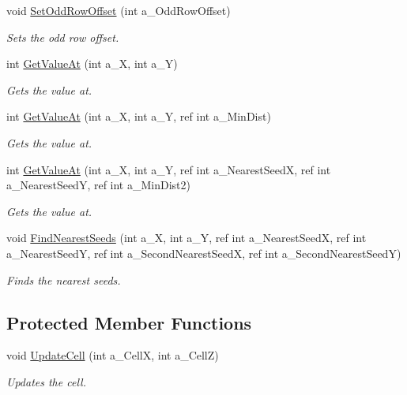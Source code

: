 \begin{DoxyCompactItemize}
void \hyperlink{classc_voronoi_map_a7c2196f0a071bb4f1ed9dbc82f42faed}{Set\+Odd\+Row\+Offset} (int a\+\_\+\+Odd\+Row\+Offset)
\begin{DoxyCompactList}\small\item\em Sets the odd row offset. \end{DoxyCompactList}\item 
int \hyperlink{classc_voronoi_map_a33e0871361414e9485ce2f6b76e8aad2}{Get\+Value\+At} (int a\+\_\+X, int a\+\_\+Y)
\begin{DoxyCompactList}\small\item\em Gets the value at. \end{DoxyCompactList}\item 
int \hyperlink{classc_voronoi_map_ae9b7f43fdbdefbcc6345ffcd93972575}{Get\+Value\+At} (int a\+\_\+X, int a\+\_\+Y, ref int a\+\_\+\+Min\+Dist)
\begin{DoxyCompactList}\small\item\em Gets the value at. \end{DoxyCompactList}\item 
int \hyperlink{classc_voronoi_map_ae3363ea6fa041e1e59701173a9b26f34}{Get\+Value\+At} (int a\+\_\+X, int a\+\_\+Y, ref int a\+\_\+\+Nearest\+SeedX, ref int a\+\_\+\+Nearest\+SeedY, ref int a\+\_\+\+Min\+Dist2)
\begin{DoxyCompactList}\small\item\em Gets the value at. \end{DoxyCompactList}\item 
void \hyperlink{classc_voronoi_map_a133dc37d5d65b9568298853af3dfc0ae}{Find\+Nearest\+Seeds} (int a\+\_\+X, int a\+\_\+Y, ref int a\+\_\+\+Nearest\+SeedX, ref int a\+\_\+\+Nearest\+SeedY, ref int a\+\_\+\+Second\+Nearest\+SeedX, ref int a\+\_\+\+Second\+Nearest\+SeedY)
\begin{DoxyCompactList}\small\item\em Finds the nearest seeds. \end{DoxyCompactList}\end{DoxyCompactItemize}
\subsection*{Protected Member Functions}
\begin{DoxyCompactItemize}
\item 
void \hyperlink{classc_voronoi_map_a39a8d8c3c8c0c4adc3d953dfc5e29b87}{Update\+Cell} (int a\+\_\+\+CellX, int a\+\_\+\+CellZ)
\begin{DoxyCompactList}\small\item\em Updates the cell. \end{DoxyCompactList}\end{DoxyCompactItemize}
